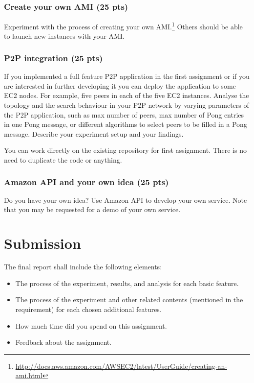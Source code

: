 \documentclass[12pt, a4paper]{article}
\begin{document}
\subsubsection{Create your own AMI (25 pts)}
Experiment with the process of creating your own AMI.\footnote{\url{http://docs.aws.amazon.com/AWSEC2/latest/UserGuide/creating-an-ami.html}}
Others should be able to launch new instances with your AMI.

\subsubsection{P2P integration (25 pts)}
If you implemented a full feature P2P application in the first assignment or if you are interested in further developing it you can deploy the application to some EC2 nodes.
For example, five peers in each of the five EC2 instances.
Analyse the topology and the search behaviour in your P2P network by varying parameters of the P2P application, such as max number of peers, max number of Pong entries in one Pong message, or different algorithms to select peers to be filled in a Pong message.
Describe your experiment setup and your findings.

You can work directly on the existing repository for first assignment.
There is no need to duplicate the code or anything.

\subsubsection{Amazon API and your own idea (25 pts)}
Do you have your own idea?
Use Amazon API to develop your own service.
Note that you may be requested for a demo of your own service.

\section{Submission}
The final report shall include the following elements:

\begin{itemize}
\item The process of the experiment, results, and analysis for each basic feature.
\item The process of the experiment and other related contents (mentioned in the requirement) for each chosen additional features.
\item How much time did you spend on this assignment.
\item Feedback about the assignment.
\end{itemize}
\end{document}
